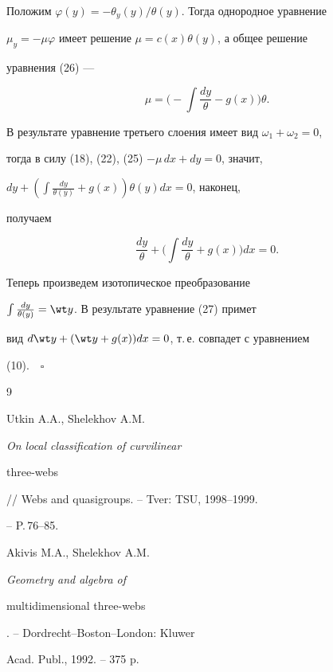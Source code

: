 Положим $\varphi(y)=-\theta_y(y)/\theta(y)$. Тогда однородное уравнение 


$\mu_y=-\mu\varphi$ имеет решение $\mu=c(x)\theta(y)$, а общее решение 


уравнения (26) --- 


$$ 


\mu=\bigg(-\int\frac{dy}{\theta}-g(x) \bigg)\theta. 


$$ 


В результате уравнение третьего слоения имеет вид $\omega_1+\omega_2=0$, 


тогда в силу (18), (22), (25)\; $-\mu\,dx+dy=0$, значит, 


$dy+\left(\int\frac{dy}{\theta(y)}+g(x)\right)\theta(y)dx=0$, наконец,


получаем


\begin{equation} 


\frac{dy}{\theta}+\bigg(\int\frac{dy}{\theta}+g(x)\bigg)dx=0. 


\end{equation} 


Теперь произведем изотопическое преобразование 


$\int\frac{dy}{\theta(y)}=\wt y$. В результате уравнение (27) примет 


вид $d\wt y+(\wt y+g(x))dx=0$, т.\,е. совпадет с уравнением 


(10).$\quad\square$ 


 


 


\begin{thebibliography}{9} 







Utkin A.A., Shelekhov A.M. {\em On local classification of curvilinear


three-webs} // Webs and quasigroups. -- Tver: TSU, 1998--1999.


-- P.\,76--85.




Akivis M.A., Shelekhov A.M. {\em Geometry and algebra of 


multidimensional three-webs}. -- Dordrecht--Boston--London: Kluwer 


Acad. Publ., 1992. -- 375 p. 


 


\end{thebibliography} 


 


\vskip 2cm 


 






\smallskip 




 


\label{end} 


 



